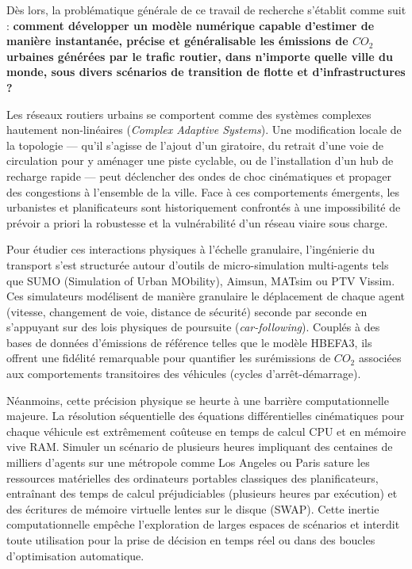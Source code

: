 \documentclass[10pt, a4paper]{article}
\begin{document}
Dès lors, la problématique générale de ce travail de recherche s'établit
comme suit : \textbf{comment développer un modèle numérique capable
d'estimer de manière instantanée, précise et généralisable les émissions
de \(CO_2\) urbaines générées par le trafic routier, dans n'importe
quelle ville du monde, sous divers scénarios de transition de flotte et
d'infrastructures ?}

Les réseaux routiers urbains se comportent comme des systèmes complexes
hautement non-linéaires (\emph{Complex Adaptive Systems}). Une
modification locale de la topologie --- qu'il s'agisse de l'ajout d'un
giratoire, du retrait d'une voie de circulation pour y aménager une
piste cyclable, ou de l'installation d'un hub de recharge rapide ---
peut déclencher des ondes de choc cinématiques et propager des
congestions à l'ensemble de la ville. Face à ces comportements
émergents, les urbanistes et planificateurs sont historiquement
confrontés à une impossibilité de prévoir a priori la robustesse et la
vulnérabilité d'un réseau viaire sous charge.

Pour étudier ces interactions physiques à l'échelle granulaire,
l'ingénierie du transport s'est structurée autour d'outils de
micro-simulation multi-agents tels que SUMO (Simulation of Urban
MObility), Aimsun, MATsim ou PTV Vissim. Ces simulateurs modélisent de
manière granulaire le déplacement de chaque agent (vitesse, changement
de voie, distance de sécurité) seconde par seconde en s'appuyant sur des
lois physiques de poursuite (\emph{car-following}). Couplés à des bases
de données d'émissions de référence telles que le modèle HBEFA3, ils
offrent une fidélité remarquable pour quantifier les surémissions de
\(CO_2\) associées aux comportements transitoires des véhicules (cycles
d'arrêt-démarrage).

Néanmoins, cette précision physique se heurte à une barrière
computationnelle majeure. La résolution séquentielle des équations
différentielles cinématiques pour chaque véhicule est extrêmement
coûteuse en temps de calcul CPU et en mémoire vive RAM. Simuler un
scénario de plusieurs heures impliquant des centaines de milliers
d'agents sur une métropole comme Los Angeles ou Paris sature les
ressources matérielles des ordinateurs portables classiques des
planificateurs, entraînant des temps de calcul préjudiciables (plusieurs
heures par exécution) et des écritures de mémoire virtuelle lentes sur
le disque (SWAP). Cette inertie computationnelle empêche l'exploration
de larges espaces de scénarios et interdit toute utilisation pour la
prise de décision en temps réel ou dans des boucles d'optimisation
automatique.
\end{document}
